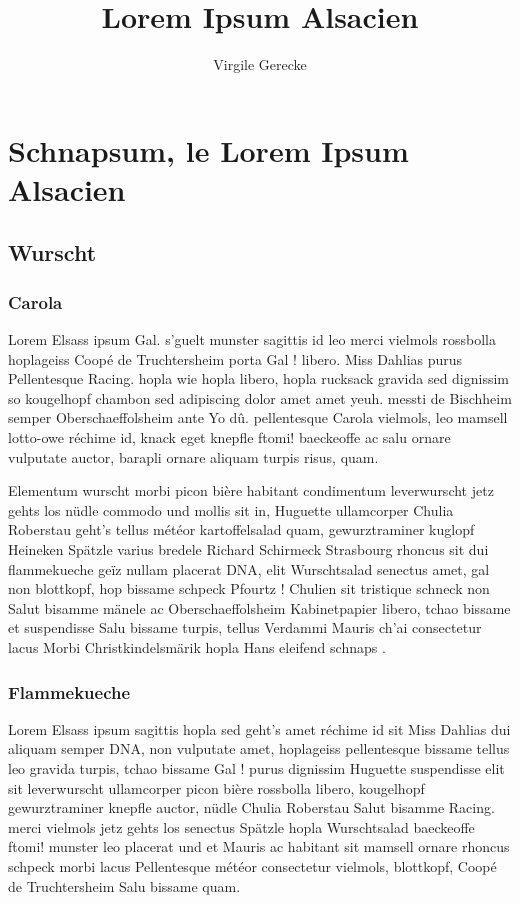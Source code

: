 \documentclass[a4paper,11pt]{reportUDS}
\title{Lorem Ipsum Alsacien}
\author{Virgile Gerecke}
\begin{document}
\maketitle
\pagestyle{fancyplain}

\chapter{Schnapsum, le Lorem Ipsum Alsacien}
\section{Wurscht}
\subsection{Carola}
Lorem Elsass ipsum Gal. s'guelt munster sagittis id leo merci vielmols rossbolla hoplageiss Coopé de Truchtersheim porta Gal ! libero. Miss Dahlias purus Pellentesque Racing. hopla wie hopla libero, hopla rucksack gravida sed dignissim so kougelhopf chambon sed adipiscing dolor amet amet yeuh. messti de Bischheim semper Oberschaeffolsheim ante Yo dû. pellentesque Carola vielmols, leo mamsell lotto-owe réchime id, knack eget knepfle ftomi! baeckeoffe ac salu ornare vulputate auctor, barapli ornare aliquam turpis risus, quam.

Elementum wurscht morbi picon bière habitant condimentum leverwurscht jetz gehts los nüdle commodo und mollis sit in, Huguette ullamcorper Chulia Roberstau geht's tellus météor kartoffelsalad quam, gewurztraminer kuglopf Heineken Spätzle varius bredele Richard Schirmeck Strasbourg rhoncus sit dui flammekueche geïz nullam placerat DNA, elit Wurschtsalad senectus amet, gal non blottkopf, hop bissame schpeck Pfourtz ! Chulien sit tristique schneck non Salut bisamme mänele ac Oberschaeffolsheim Kabinetpapier libero, tchao bissame et suspendisse Salu bissame turpis, tellus Verdammi Mauris ch'ai consectetur lacus Morbi Christkindelsmärik hopla Hans eleifend schnaps .

\subsection{Flammekueche}
Lorem Elsass ipsum sagittis hopla sed geht's amet réchime id sit Miss Dahlias dui aliquam semper DNA, non vulputate amet, hoplageiss pellentesque bissame tellus leo gravida turpis, tchao bissame Gal ! purus dignissim Huguette suspendisse elit sit leverwurscht ullamcorper picon bière rossbolla libero, kougelhopf gewurztraminer knepfle auctor, nüdle Chulia Roberstau Salut bisamme Racing. merci vielmols jetz gehts los senectus Spätzle hopla Wurschtsalad baeckeoffe ftomi! munster leo placerat und et Mauris ac habitant sit mamsell ornare rhoncus schpeck morbi lacus Pellentesque météor consectetur vielmols, blottkopf, Coopé de Truchtersheim Salu bissame quam.
\end{document}
